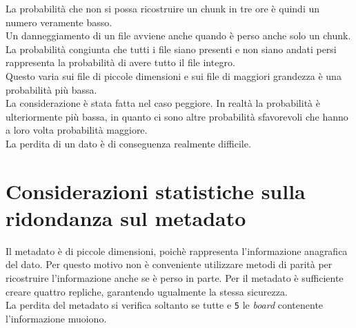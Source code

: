 La probabilit\`{a} che non si possa ricostruire un chunk in tre ore \`{e} quindi un numero veramente basso.\\

Un danneggiamento di un file avviene anche quando \`{e} perso anche solo un chunk. La probabilit\`{a} congiunta che tutti i file siano presenti e non siano andati persi rappresenta la probabilit\`{a} di avere tutto il file integro.\\
Questo varia sui file di piccole dimensioni e sui file di maggiori grandezza \`{e} una probabilit\`{a} pi\`{u} bassa.\\

La considerazione \`{e} stata fatta nel caso peggiore. In realt\`{a} la probabilit\`{a} \`{e} ulteriormente pi\`{u} bassa, in quanto ci sono altre probabilit\`{a} sfavorevoli che hanno a loro volta probabilit\`{a} maggiore.\\
La perdita di un dato \`{e} di conseguenza realmente difficile.


\section{Considerazioni statistiche sulla ridondanza sul metadato}
Il metadato \`{e} di piccole dimensioni, poich\`{e} rappresenta l'informazione anagrafica del dato. 
Per questo motivo non \`{e} conveniente utilizzare metodi di parit\`{a} per ricostruire l'informazione anche se \`{e} perso in parte.
Per il metadato \`{e} sufficiente creare quattro repliche, garantendo ugualmente la stessa sicurezza. \\
La perdita del metadato si verifica soltanto se tutte e \verb"5" le \textit{board} contenente l'informazione muoiono.